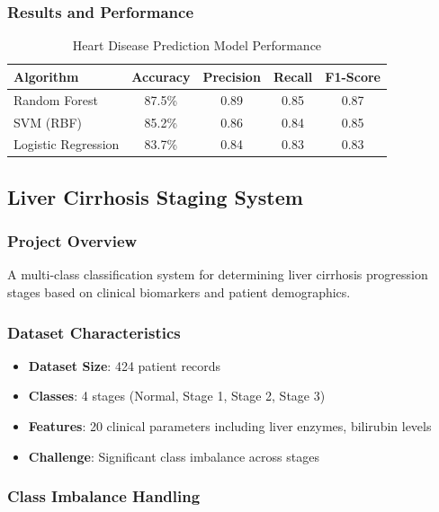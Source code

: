 \documentclass[12pt, a4paper]{article}
\begin{document}
\subsubsection{Results and Performance}
\begin{table}[H]
    \centering
    \begin{tabular}{@{}lcccc@{}}
        \toprule
        Algorithm           & Accuracy & Precision & Recall & F1-Score \\
        \midrule
        Random Forest       & 87.5\%   & 0.89      & 0.85   & 0.87     \\
        SVM (RBF)           & 85.2\%   & 0.86      & 0.84   & 0.85     \\
        Logistic Regression & 83.7\%   & 0.84      & 0.83   & 0.83     \\
        \bottomrule
    \end{tabular}
    \caption{Heart Disease Prediction Model Performance}
\end{table}

\subsection{Liver Cirrhosis Staging System}

\subsubsection{Project Overview}
A multi-class classification system for determining liver cirrhosis progression stages based on clinical biomarkers and patient demographics.

\subsubsection{Dataset Characteristics}
\begin{itemize}
    \item \textbf{Dataset Size}: 424 patient records
    \item \textbf{Classes}: 4 stages (Normal, Stage 1, Stage 2, Stage 3)
    \item \textbf{Features}: 20 clinical parameters including liver enzymes, bilirubin levels
    \item \textbf{Challenge}: Significant class imbalance across stages
\end{itemize}

\subsubsection{Class Imbalance Handling}
\end{document}

